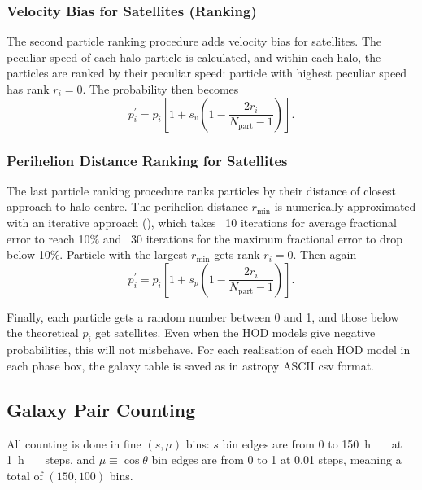 \documentclass[fleqn,usenatbib]{mnras}
\begin{document}
		\subsubsection{Velocity Bias for Satellites (Ranking)}
			
			The second particle ranking procedure adds velocity bias for satellites. The peculiar speed of each halo particle is calculated, and within each halo, the particles are ranked by their peculiar speed: particle with highest peculiar speed has rank $r_i=0$. The probability then becomes
			\begin{equation}
				p_i ^\prime = p_i \left[ 1 + s_v (1 - \frac{2 r_i}{N_\text{part} - 1}) \right] .
			\end{equation}
			
		\subsubsection{Perihelion Distance Ranking for Satellites}
			
			The last particle ranking procedure ranks particles by their distance of closest approach to halo centre. The perihelion distance $r_\text{min}$ is numerically approximated with an iterative approach (\cite{yuan2018}), which takes ~10 iterations for average fractional error to reach 10\% and ~30 iterations for the maximum fractional error to drop below 10\%. Particle with the largest $r_\text{min}$ gets rank $r_i = 0$. Then again
			\begin{equation}
				p_i ^\prime = p_i \left[ 1 + s_p (1 - \frac{2 r_i}{N_\text{part} - 1}) \right] .
			\end{equation}
			
		Finally, each particle gets a random number between 0 and 1, and those below the theoretical $p_i$ get satellites. Even when the HOD models give negative probabilities, this will not misbehave. For each realisation of each HOD model in each phase box, the galaxy table is saved as in astropy ASCII csv format.

	\subsection{Galaxy Pair Counting}
	
		All counting is done in fine $(s, \mu)$ bins: $s$ bin edges are from 0 to \SI{150}{h  \mega\parsec} at \SI{1}{h  \mega\parsec} steps, and $\mu \equiv \cos\theta$ bin edges are from 0 to 1 at 0.01 steps, meaning a total of $(150, 100)$ bins.
		
\end{document}
